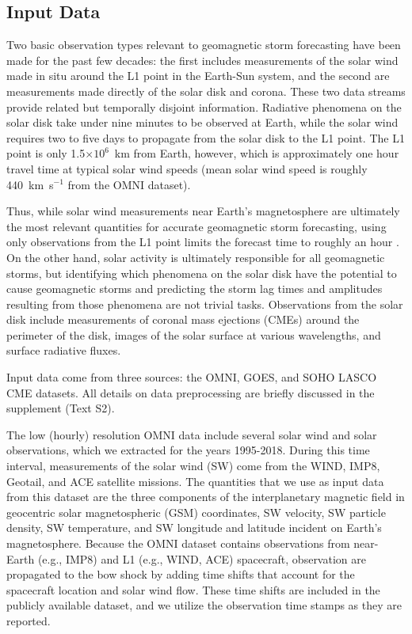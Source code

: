 \subsection{Input Data}

Two basic observation types relevant to geomagnetic storm forecasting have been made for the past few decades: the first includes measurements of the solar wind made in situ around the L1 point in the Earth-Sun system, and the second are measurements made directly of the solar disk and corona. These two data streams provide related but temporally disjoint information. Radiative phenomena on the solar disk take under nine minutes to be observed at Earth, while the solar wind requires two to five days to propagate from the solar disk to the L1 point. The L1 point is only 1.5$\times 10^{6}$~km from Earth, however, which is approximately one hour travel time at typical solar wind speeds (mean solar wind speed is roughly 440~km~s$^{-1}$ from the OMNI dataset).

Thus, while solar wind measurements near Earth's magnetosphere are ultimately the most relevant quantities for accurate geomagnetic storm forecasting, using only observations from the L1 point limits the forecast time to roughly an hour \citep{Shprits2019}. On the other hand, solar activity is ultimately responsible for all geomagnetic storms, but identifying which phenomena on the solar disk have the potential to cause geomagnetic storms and predicting the storm lag times and amplitudes resulting from those phenomena are not trivial tasks. Observations from the solar disk include measurements of coronal mass ejections (CMEs) around the perimeter of the disk, images of the solar surface at various wavelengths, and surface radiative fluxes. 

Input data come from three sources: the OMNI, GOES, and SOHO LASCO CME datasets. All details on data preprocessing are briefly discussed in the supplement (Text S2).

The low (hourly) resolution OMNI data include several solar wind and solar observations, which we extracted for the years 1995-2018. During this time interval, measurements of the solar wind (SW) come from the WIND, IMP8, Geotail, and ACE satellite missions. The quantities that we use as input data from this dataset are the three components of the interplanetary magnetic field in geocentric solar magnetospheric (GSM) coordinates, SW velocity, SW particle density, SW temperature, and SW longitude and latitude incident on Earth's magnetosphere. Because the OMNI dataset contains observations from near-Earth (e.g., IMP8) and L1 (e.g., WIND, ACE) spacecraft, observation are propagated to the bow shock by adding time shifts that account for the spacecraft location and solar wind flow. These time shifts are included in the publicly available dataset, and we utilize the observation time stamps as they are reported.

